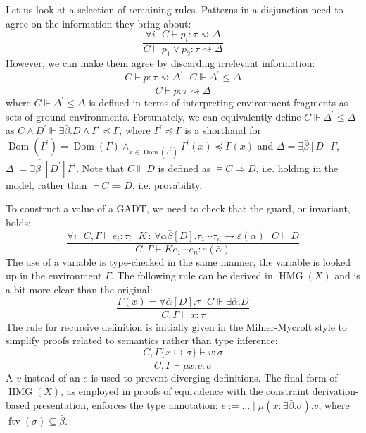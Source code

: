 \documentclass{article}
\newcommand{\assign}{:=}
\newcommand{\colons}{\,:\,}
\newcommand{\tmop}[1]{\ensuremath{\operatorname{#1}}}
\begin{document}
Let us look at a selection of remaining rules. Patterns in a disjunction need
to agree on the information they bring about:
\[ \frac{\forall i \text{ \ \ } C \vdash p_i : \tau \rightsquigarrow \Delta}{C
   \vdash p_1 \vee p_2 : \tau \rightsquigarrow \Delta} \]
However, we can make them agree by discarding irrelevant information:
\[ \frac{C \vdash p : \tau \rightsquigarrow \Delta^{\prime} \text{ \ \ \ } C
   \Vdash \Delta^{\prime} \leqslant \Delta}{C \vdash p : \tau \rightsquigarrow
   \Delta} \]
where $C \Vdash \Delta^{\prime} \leqslant \Delta$ is defined in terms of
interpreting environment fragments as sets of ground environments.
Fortunately, we can equivalently define $C \Vdash \Delta^{\prime} \leqslant
\Delta$ as $C \wedge D^{\prime} \Vdash \exists \bar{\beta} .D \wedge
\Gamma^{\prime} \preccurlyeq \Gamma$, where $\Gamma^{\prime} \preccurlyeq
\Gamma$ is a shorthand for $\tmop{Dom} (\Gamma^{\prime}) = \tmop{Dom} (\Gamma)
\wedge_{x \in \tmop{Dom} (\Gamma^{\prime})} \Gamma^{\prime} (x) \preccurlyeq
\Gamma (x)$ and $\Delta = \exists \bar{\beta} [D] \Gamma$, $\Delta^{\prime} =
\exists \overline{\beta^{\prime}} [D^{\prime}] \Gamma^{\prime}$. Note that $C
\Vdash D$ is defined as $\vDash C \Rightarrow D$, i.e. holding in the model,
rather than $\vdash C \Rightarrow D$, i.e. provability.

To construct a value of a GADT, we need to check that the guard, or invariant,
holds:
\[ \frac{\forall i \text{ \ \ } C, \Gamma \vdash e_i : \tau_i \text{ \ \ \ } K
   \colons \forall \bar{\alpha} \bar{\beta} [D] . \tau_1 \cdots \tau_n
   \rightarrow \varepsilon (\bar{\alpha}) \text{ \ \ \ } C \Vdash D}{C, \Gamma
   \vdash K e_1 \cdots e_n : \varepsilon (\bar{\alpha})} \]
The use of a variable is type-checked in the same manner, the variable is
looked up in the environment $\Gamma$. The following rule can be derived in
$\tmop{HMG} (X)$ and is a bit more clear than the original:
\begin{equation}
  \frac{\Gamma (x) = \forall \bar{\alpha} [D] . \tau \text{ \ \ } C \Vdash
  \exists \bar{\alpha} .D}{C, \Gamma \vdash x : \tau} \label{HMGVarRule}
\end{equation}
The rule for recursive definition is initially given in the Milner-Mycroft
style to simplify proofs related to semantics rather than type inference:
\[ \frac{C, \Gamma \{ x \mapsto \sigma \} \vdash v : \sigma}{C, \Gamma \vdash
   \mu x.v : \sigma} \]
A $v$ instead of an $e$ is used to prevent diverging definitions. The final
form of $\tmop{HMG} (X)$, as employed in proofs of equivalence with the
constraint derivation-based presentation, enforces the type annotation: $e
\assign \ldots \; | \; \mu (x : \exists \bar{\beta} . \sigma) .v$, where
$\tmop{ftv} (\sigma) \subseteq \bar{\beta}$.
\end{document}
